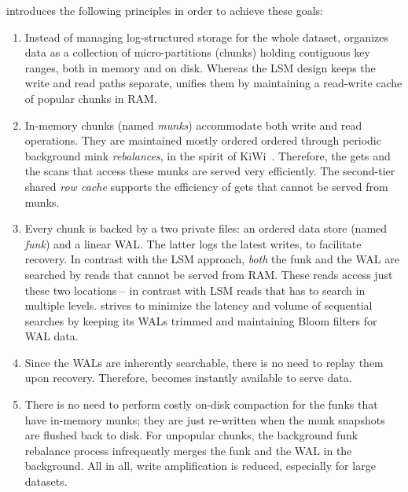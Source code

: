 \sys\/ introduces the following principles in order to achieve these goals: 
\begin{enumerate}

\item Instead of managing log-structured storage for the whole dataset, 
\sys\/ organizes data as a collection of micro-partitions (chunks) holding contiguous key ranges, 
both in memory and on disk. Whereas the LSM design keeps the write and read paths separate, 
\sys\/ unifies them by maintaining a read-write cache of popular chunks in RAM. 

\item In-memory chunks (named {\em munks}) accommodate both write and read operations. 
They are maintained mostly ordered ordered through periodic background mink {\em rebalances}, 
in the spirit of KiWi~\cite{KiWi}. Therefore, the gets and the scans that access these munks are 
served very efficiently. The second-tier shared {\emph{row cache}} supports the efficiency of 
gets that cannot be served from munks. 

\item Every chunk is backed by a two private files: an ordered data store (named {\em funk}) 
and a linear WAL. The latter logs the latest writes, to facilitate recovery. In contrast 
with the LSM approach, {\em both\/} the funk and the WAL are searched by reads that cannot 
be served from RAM. These reads access just these two locations -- in contrast with LSM reads  
that has to search in multiple levels. \sys\/ strives to minimize the latency and volume of sequential 
searches by keeping its WALs trimmed and maintaining Bloom filters for WAL data. 

\item Since the WALs are inherently searchable, there is no need to replay them upon recovery. 
Therefore, \sys\/ becomes instantly available to serve data. 

\item There is no need to perform costly on-disk compaction for the funks that have in-memory 
munks; they are just re-written when the munk snapshots are flushed back to disk. For unpopular chunks, 
the background funk rebalance process infrequently merges the funk and the WAL in the background. 
All in all, write amplification is reduced, especially for large datasets. 
 \end{enumerate}

